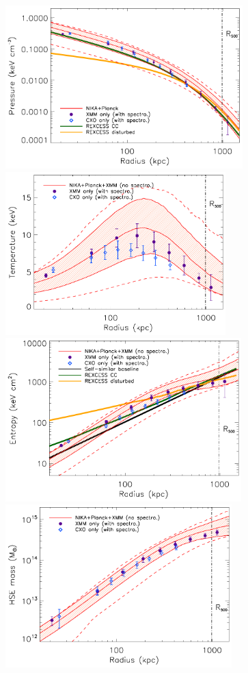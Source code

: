 \documentclass[traditabstract]{aa}
\begin{document}
\begin{figure}[h]
\centering
\includegraphics[height=6.3cm]{Figure/ICM_pressure_profile_xray.pdf}
\includegraphics[height=6.3cm]{Figure/ICM_temperature_profile.pdf}
\includegraphics[height=6.3cm]{Figure/ICM_entropy_profile.pdf}
\includegraphics[height=6.3cm]{Figure/ICM_mass_profile.pdf}

\end{figure}
\end{document}
